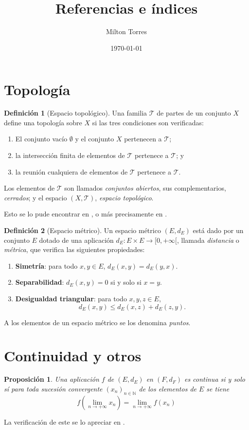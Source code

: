 \documentclass[11pt]{article}
\title{Referencias e índices}
\author{Milton Torres}
\date{\today}
\theoremstyle{plain}%
\newtheorem{prop}[thm]{Proposición}
\theoremstyle{definition}%
\newtheorem{defn}{Definición}[section]
\begin{document}
\maketitle
\tableofcontents

\section{Topología}
\begin{defn}[Espacio topológico]
	Una familia \(\mathcal{T}\) de partes de un conjunto \(X\) define una topología sobre \(X\) si las tres condiciones son verificadas:
	\begin{enumerate}
		\item El conjunto vacío \(\emptyset\) y el conjunto \(X\) pertenecen a \(\mathcal{T}\);
		\item la intersección finita de elementos de \(\mathcal{T}\) pertenece a \(\mathcal{T}\); y
		\item la reunión cualquiera de elementos de \(\mathcal{T}\) pertenece a \(\mathcal{T}\).
	\end{enumerate}
	Los elementos de \(\mathcal{T}\) son llamados \emph{conjuntos abiertos}, sus complementarios, \emph{cerrados}; y el espacio \((X, \mathcal{T})\), \emph{espacio topológico}.
	 
\end{defn}
Esto se lo pude encontrar en \cite{VK1997}, o más precisamente en \cite[p.\,3]{VK1997}.


\begin{defn}[Espacio métrico]
	Un espacio métrico \((E, d_{E})\) está dado por un conjunto \(E\) dotado de una aplicación  \(d_E : E \times E \longrightarrow [0,+\infty[\), llamada \emph{distancia} o \emph{métrica}, que verifica las siguientes propiedades:
	\begin{enumerate}
		\item[D.1] \textbf{Simetría}: para todo \(x, y\in E\), \(d_{E}(x,y) = d_{E} (y,x)\).
		\item[D.2] \textbf{Separabilidad}: \(d_{E}(x,y)=0\) si y solo si \(x=y\).
		\item[D.3] \textbf{Desigualdad triangular}: para todo \(x, y, z\in E\),
		\[
			d_{E}(x,y)\leq d_{E}(x,z)+d_{E}(z,y).
      		\]
	\end{enumerate}
	A los elementos de un espacio métrico se los denomina \emph{puntos}.
\end{defn}


\newpage
\section{Continuidad y otros}
\begin{prop}
	Una aplicación \(f\) de \((E, d_E)\) en \((F,d_F)\) es continua si y solo sí para toda sucesión convergente \((x_n)_{n\in\mathbb{N}}\) de los elementos de \(E\) se tiene
	\[
		f \left(\lim_{n \to +\infty} x_n \right) = \lim_{n \to +\infty} f(x_n)
	\]
\end{prop}
La verificación de este se lo apreciar en \cite{EK1989}. %
\end{document}
